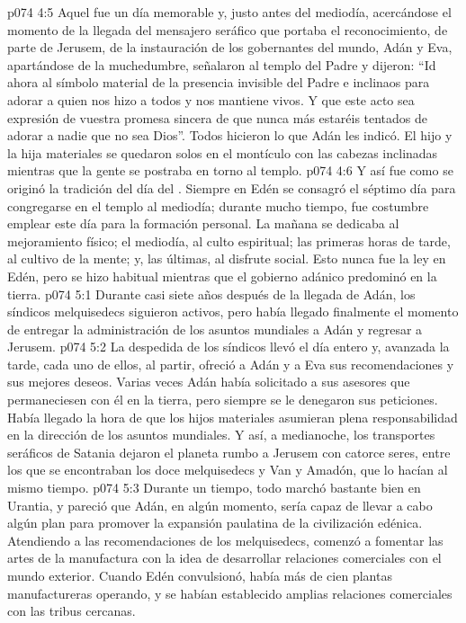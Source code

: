 \vs p074 4:5 Aquel fue un día memorable y, justo antes del mediodía, acercándose el momento de la llegada del mensajero seráfico que portaba el reconocimiento, de parte de Jerusem, de la instauración de los gobernantes del mundo, Adán y Eva, apartándose de la muchedumbre, señalaron al templo del Padre y dijeron: “Id ahora al símbolo material de la presencia invisible del Padre e inclinaos para adorar a quien nos hizo a todos y nos mantiene vivos. Y que este acto sea expresión de vuestra promesa sincera de que nunca más estaréis tentados de adorar a nadie que no sea Dios”. Todos hicieron lo que Adán les indicó. El hijo y la hija materiales se quedaron solos en el montículo con las cabezas inclinadas mientras que la gente se postraba en torno al templo.
\vs p074 4:6 \pc Y así fue como se originó la tradición del día del . Siempre en Edén se consagró el séptimo día para congregarse en el templo al mediodía; durante mucho tiempo, fue costumbre emplear este día para la formación personal. La mañana se dedicaba al mejoramiento físico; el mediodía, al culto espiritual; las primeras horas de tarde, al cultivo de la mente; y, las últimas, al disfrute social. Esto nunca fue la ley en Edén, pero se hizo habitual mientras que el gobierno adánico predominó en la tierra.
\vs p074 5:1 Durante casi siete años después de la llegada de Adán, los síndicos melquisedecs siguieron activos, pero había llegado finalmente el momento de entregar la administración de los asuntos mundiales a Adán y regresar a Jerusem.
\vs p074 5:2 La despedida de los síndicos llevó el día entero y, avanzada la tarde, cada uno de ellos, al partir, ofreció a Adán y a Eva sus recomendaciones y sus mejores deseos. Varias veces Adán había solicitado a sus asesores que permaneciesen con él en la tierra, pero siempre se le denegaron sus peticiones. Había llegado la hora de que los hijos materiales asumieran plena responsabilidad en la dirección de los asuntos mundiales. Y así, a medianoche, los transportes seráficos de Satania dejaron el planeta rumbo a Jerusem con catorce seres, entre los que se encontraban los doce melquisedecs y Van y Amadón, que lo hacían al mismo tiempo.
\vs p074 5:3 \pc Durante un tiempo, todo marchó bastante bien en Urantia, y pareció que Adán, en algún momento, sería capaz de llevar a cabo algún plan para promover la expansión paulatina de la civilización edénica. Atendiendo a las recomendaciones de los melquisedecs, comenzó a fomentar las artes de la manufactura con la idea de desarrollar relaciones comerciales con el mundo exterior. Cuando Edén convulsionó, había más de cien plantas manufactureras operando, y se habían establecido amplias relaciones comerciales con las tribus cercanas.
